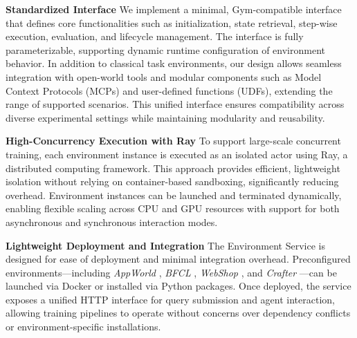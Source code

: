 \textbf{Standardized Interface} \quad
We implement a minimal, Gym-compatible interface that defines core functionalities such as initialization, state retrieval, step-wise execution, evaluation, and lifecycle management. The interface is fully parameterizable, supporting dynamic runtime configuration of environment behavior. In addition to classical task environments, our design allows seamless integration with open-world tools and modular components such as Model Context Protocols (MCPs) and user-defined functions (UDFs), extending the range of supported scenarios. This unified interface ensures compatibility across diverse experimental settings while maintaining modularity and reusability.

\textbf{High-Concurrency Execution with Ray} \quad
To support large-scale concurrent training, each environment instance is executed as an isolated actor using Ray, a distributed computing framework. This approach provides efficient, lightweight isolation without relying on container-based sandboxing, significantly reducing overhead. Environment instances can be launched and terminated dynamically, enabling flexible scaling across CPU and GPU resources with support for both asynchronous and synchronous interaction modes.

\textbf{Lightweight Deployment and Integration} \quad
The Environment Service is designed for ease of deployment and minimal integration overhead. Preconfigured environments—including \textit{AppWorld} \citep{trivedi2024appworld}, \textit{BFCL} \citep{patil2025bfcl}, \textit{WebShop} \citep{yao2022webshop}, and \textit{Crafter} \citep{hafner2021benchmarking}—can be launched via Docker or installed via Python packages. Once deployed, the service exposes a unified HTTP interface for query submission and agent interaction, allowing training pipelines to operate without concerns over dependency conflicts or environment-specific installations.
